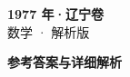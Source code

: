 \documentclass[zihao=-4, a4paper]{ctexart}
\begin{document}
\begin{center}
  {\Large\bfseries 1977 年·辽宁卷}\\[4pt]
  {\large 数学 · 解析版}
\end{center}
\medskip
{}

\clearpage
{}
\begin{center}{\Large\bfseries 参考答案与详细解析}\end{center}
\medskip

\end{document}

